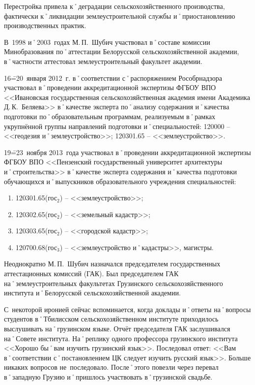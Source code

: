 Перестройка привела к˚деградации сельскохозяйственного производства, фактически к˚ликвидации землеустроительной службы и˚приостановлению производственных практик. 

В~1998 и˚2003~годах М.\,П.~Шубич участвовал в˚составе комиссии Минобразования по˚аттестации Белорусской сельскохозяйственной академии, в˚частности аттестовал землеустроительный факультет академии. 

16\==20~января 2012~г. в˚соответствии с˚распоряжением Рособрнадзора участвовал в˚проведении аккредитационной экспертизы ФГБОУ ВПО <<Ивановская государственная сельскохозяйственная академия имени Академика Д.\,К.~Беляева>> в˚качестве эксперта по˚анализу содержания и˚качества подготовки по˚образовательным программам, реализуемым в˚рамках укрупнённой группы направлений подготовки и˚специальностей: 120000 \--- <<геодезия и˚землеустройство>>; 120301.65 \--- <<землеустройство>>.

19\==23~ноября 2013~года участвовал в˚проведении аккредитационной экспертизы ФГБОУ ВПО <<Пензенский государственный университет архитектуры и˚строительства>> в˚качестве эксперта содержания и˚качества подготовки обучающихся и˚выпускников образовательного учреждения специальностей:

\begin{enumerate}
	\item 120301.65(гос$_2$) \--- <<землеустройство>>; 
	\item 120302.65(гос$_2$) \--- <<земельный кадастр>>; 
	\item 120303.65(гос$_2$) \--- <<городской кадастр>>; 
 	\item 120700.68(гос$_3$) \--- <<землеустройство и˚кадастры>>, магистры.
\end{enumerate}

Неоднократно М.\,П.~Шубич назначался председателем государственных аттестационных комиссий (ГАК). Был председателем ГАК на˚землеустроительных факультетах Грузинского сельскохозяйственного института и˚Белорусской сельскохозяйственной академии. 

С~некоторой иронией сейчас вспоминается, когда доклады и˚ответы на˚вопросы студентов в˚Тбилисском сельскохозяйственном институте приходилось выслушивать на˚грузинском языке. Отчёт председателя ГАК заслушивался на˚Совете института. На˚реплику одного профессора грузинского института <<Хорошо бы˚вам изучить грузинский язык>>. Последовал ответ: <<Вам в˚соответствии с˚постановлением ЦК следует изучить русский язык>>. Больше никаких вопросов не~последовало. После˚этого повезли через перевал в˚западную Грузию и˚пришлось участвовать в˚грузинской свадьбе.

